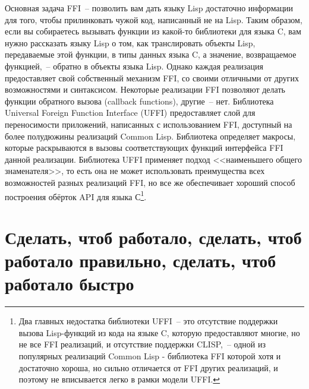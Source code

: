 Основная задача FFI~-- позволить вам дать языку Lisp достаточно информации для того, чтобы
прилинковать чужой код, написанный не на Lisp. Таким образом, если вы собираетесь вызывать
функции из какой-то библиотеки для языка C, вам нужно рассказать языку Lisp о том, как
транслировать объекты Lisp, передаваемые этой функции, в типы данных языка C, а значение,
возвращаемое функцией,~-- обратно в объекты языка Lisp. Однако каждая реализация
предоставляет свой собственный механизм FFI, со своими отличными от других возможностями и
синтаксисом. Некоторые реализации FFI позволяют делать функции обратного вызова (callback
functions), другие~-- нет. Библиотека Universal Foreign Function Interface (UFFI)
предоставляет слой для переносимости приложений, написанных с использованием FFI,
доступный на более полудюжины реализаций Common Lisp. Библиотека определяет макросы,
которые раскрываются в вызовы соответствующих функций интерфейса FFI данной
реализации. Библиотека UFFI применяет подход <<наименьшего общего знаменателя>>, то есть
она не может использовать преимущества всех возможностей разных реализаций FFI, но все же
обеспечивает хороший способ построения обёрток API для языка С\footnote{Два главных
    недостатка библиотеки UFFI~-- это отсутствие поддержки вызова Lisp-функций из кода на
    языке C, которую предоставляют многие, но не все FFI реализаций, и отсутствие
    поддержки CLISP,~-- одной из популярных реализаций Common Lisp - библиотека FFI
    которой хотя и достаточно хороша, но сильно отличается от FFI других реализаций, и
    поэтому не вписывается легко в рамки модели UFFI.}.

\section{Сделать, чтоб работало, сделать, чтоб работало правильно, сделать, чтоб работало быстро}

